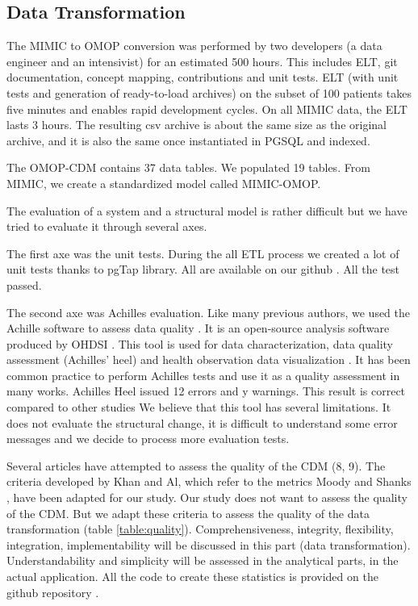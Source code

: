 %
% 
\subsection{Data Transformation}

The MIMIC to OMOP conversion was performed by two developers (a data engineer 
and an intensivist) for an estimated 500 hours. This includes ELT, git 
documentation, concept mapping, contributions and unit tests. 
ELT (with unit tests and generation of ready-to-load archives) on the subset 
of 100 patients takes five minutes and enables rapid development cycles. 
On all MIMIC data, the ELT lasts 3 hours. The resulting csv archive is about 
the same size as the original archive, and it is also the same once 
instantiated in PGSQL and indexed.

The OMOP-CDM contains 37 data tables. We populated 19 tables. 
From MIMIC, we create a standardized model called MIMIC-OMOP.

The evaluation of a system and a structural model is rather difficult \cite{moody-quality} 
but we have tried to evaluate it through several axes.

The first axe was the unit tests. During the all ETL process we created a lot 
of unit tests thanks to pgTap library. 
All are available on our github \cite{mimic-omop-website}. All the test passed.

The second axe was Achilles evaluation. Like many previous authors, 
we used the Achille software to assess data quality \cite{achilles-evaluation}. 
It is an open-source analysis software produced by OHDSI \cite{ohdsi-achilles}.
This tool is used for data characterization, data quality assessment 
(Achilles' heel) and health observation data visualization \cite{ohdsi-achilles}.
It has been common practice to perform Achilles tests and use it as a 
quality assessment in many works. Achilles Heel issued 12 errors and y warnings. 
This result is correct compared to other studies \cite{achilles-evaluation}
We believe that this tool has several limitations. It does not evaluate 
the structural change, it is difficult to understand some error messages and 
we decide to process more evaluation tests.     


Several articles have attempted to assess the quality of the CDM (8, 9). 
The criteria developed by Khan and Al\cite{khan-quality}, which refer to the metrics 
Moody and Shanks \cite{moody-quality}, have been adapted for our study. 
Our study does not want to assess the quality of the CDM. But we adapt these 
criteria to assess the quality of the data transformation (table \ref{table:quality}).
Comprehensiveness, integrity, flexibility, integration, implementability 
will be discussed in this part (data transformation). 
Understandability and simplicity will be assessed in the analytical parts, 
in the actual application.
All the code to create these statistics is provided on the github repository 
\cite{mimic-omop-website}.

